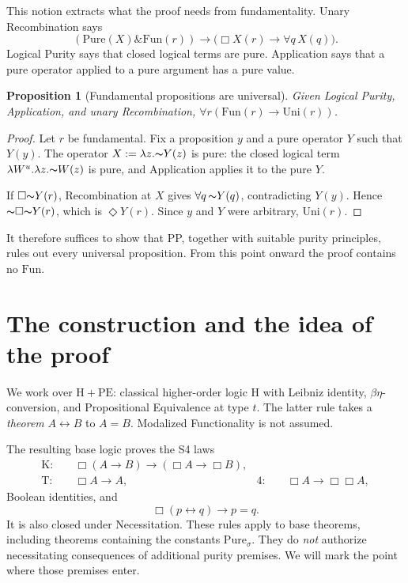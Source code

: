 \documentclass[12pt,leqno]{article}
\newcommand{\AND}{\ensuremath{\mathbin{\&}}}
\newcommand{\IFF}{\ensuremath{\leftrightarrow}}
\newcommand{\IC}{\ensuremath{\rightarrow}}
\newcommand{\NOT}{\ensuremath{\text{$\thicksim$}}}
\newcommand{\Pure}{\ensuremath{\mathrm{Pure}}}
\newcommand{\Fun}{\ensuremath{\mathrm{Fun}}}
\newcommand{\Uni}{\ensuremath{\mathrm{Uni}}}
\newcommand{\HPE}{\ensuremath{\mathrm{H}+\mathrm{PE}}}
\theoremstyle{plain}
\newtheorem*{proposition}{Proposition}
\begin{document}
This notion extracts what the proof needs from fundamentality.
Unary Recombination says
\[
 (\Pure(X)\AND\Fun(r))
   \IC\bigl(\Box X(r)\IC\forall q\,X(q)\bigr).
\]
Logical Purity says that closed logical terms are pure. Application says
that a pure operator applied to a pure argument has a pure value.

\begin{proposition}[Fundamental propositions are universal]\label{prop:fundamental}
Given Logical Purity, Application, and unary Recombination,
\(\forall r(\Fun(r)\IC\Uni(r))\).
\end{proposition}
\begin{proof}
Let \(r\) be fundamental. Fix a proposition \(y\) and a pure operator
\(Y\) such that \(Y(y)\). The operator
\(X:=\lambda z.\NOT Y(z)\) is pure: the closed logical term
\(\lambda W^u.\lambda z.\NOT W(z)\) is pure, and Application applies
it to the pure \(Y\).

If \(\Box\NOT Y(r)\), Recombination at \(X\) gives
\(\forall q\,\NOT Y(q)\), contradicting \(Y(y)\). Hence
\(\NOT\Box\NOT Y(r)\), which is \(\Diamond Y(r)\). Since \(y\) and
\(Y\) were arbitrary, \(\Uni(r)\).
\end{proof}

It therefore suffices to show that PP, together with suitable purity
principles, rules out every universal proposition. From this point onward
the proof contains no \(\Fun\).

\section{The construction and the idea of the proof}

We work over \HPE: classical higher-order logic H with Leibniz identity,
\(\beta\eta\)-conversion, and Propositional Equivalence at type \(t\).
The latter rule takes a \emph{theorem} \(A\IFF B\) to \(A=B\).
Modalized Functionality is not assumed.

The resulting base logic proves the S4 laws
\[
 \begin{aligned}
 \mathrm{K}:&\quad \Box(A\IC B)\IC(\Box A\IC\Box B),\\
 \mathrm{T}:&\quad \Box A\IC A,
 &\mathrm{4}:&\quad \Box A\IC\Box\Box A,
 \end{aligned}
\]
Boolean identities, and
\[
 \Box(p\IFF q)\IC p=q.
\]
It is also closed under Necessitation. These rules apply to base theorems,
including theorems containing the constants \(\Pure_\sigma\).
They do \emph{not} authorize necessitating consequences of additional
purity premises. We will mark the point where those premises enter.
\end{document}
